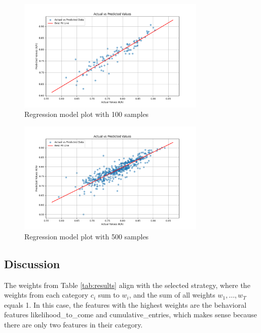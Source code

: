 \documentclass[12pt]{book}
\begin{document}
\newpage
\begin{figure}[H]
    \centering
    \includegraphics[width=0.8\textwidth]{figures/100.png}
    \caption{Regression model plot with 100 samples}
    \label{fig:100samples}
\end{figure}

\begin{figure}[H]
    \centering
    \includegraphics[width=0.8\textwidth]{figures/500.png}
    \caption{Regression model plot with 500 samples}
    \label{fig:500samples}
\end{figure}












\subsection{Discussion}

The weights from Table \ref{tab:results} align with the selected strategy, where the weights from each category $c_i$ sum to $w_i$, and the sum of all weights $w_1, \ldots, w_T$ equals 1. In this case, the features with the highest weights are the behavioral features likelihood\_to\_come and cumulative\_entries, which makes sense because there are only two features in their category.
\end{document}
